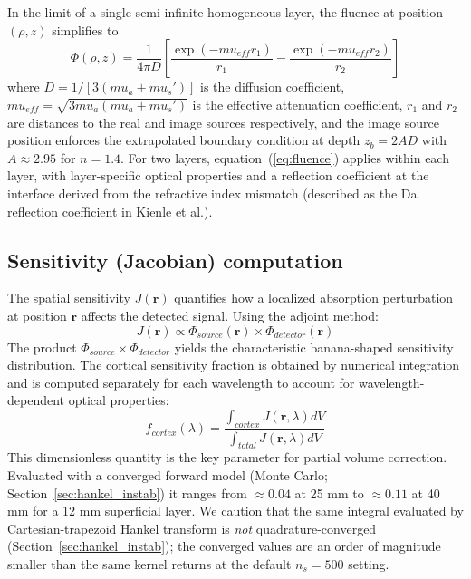\documentclass[11pt]{article}
\def\mu{mu}%
\def\mathrm#1{#1}%
\def\,{ }%
\begin{document}
In the limit of a single semi-infinite homogeneous layer, the fluence at position $(\rho, z)$ simplifies to
\begin{equation}
\Phi(\rho, z) = \frac{1}{4\pi D}\left[\frac{\exp(-\mu_{\mathrm{eff}}\,r_1)}{r_1} - \frac{\exp(-\mu_{\mathrm{eff}}\,r_2)}{r_2}\right]
\label{eq:fluence}
\end{equation}
where $D = 1/[3(\mu_a + \mu_s')]$ is the diffusion coefficient, $\mu_{\mathrm{eff}} = \sqrt{3\mu_a(\mu_a + \mu_s')}$ is the effective attenuation coefficient, $r_1$ and $r_2$ are distances to the real and image sources respectively, and the image source position enforces the extrapolated boundary condition at depth $z_b = 2AD$ with $A \approx 2.95$ for $n = 1.4$\cite{r27}. For two layers, equation~(\ref{eq:fluence}) applies within each layer, with layer-specific optical properties and a reflection coefficient at the interface derived from the refractive index mismatch (described as the Da reflection coefficient in Kienle et al.\cite{r40}).

\subsection{Sensitivity (Jacobian) computation}
\label{sec:jacobian}

The spatial sensitivity $J(\mathbf{r})$ quantifies how a localized absorption perturbation at position $\mathbf{r}$ affects the detected signal. Using the adjoint method\cite{r26,r28}:
\begin{equation}
J(\mathbf{r}) \propto \Phi_{\mathrm{source}}(\mathbf{r}) \times \Phi_{\mathrm{detector}}(\mathbf{r})
\label{eq:jacobian}
\end{equation}
The product $\Phi_{\mathrm{source}} \times \Phi_{\mathrm{detector}}$ yields the characteristic banana-shaped sensitivity distribution. The cortical sensitivity fraction is obtained by numerical integration and is computed separately for each wavelength to account for wavelength-dependent optical properties:
\begin{equation}
f_{\mathrm{cortex}}(\lambda) = \frac{\int_{\mathrm{cortex}} J(\mathbf{r}, \lambda)\,dV}{\int_{\mathrm{total}} J(\mathbf{r}, \lambda)\,dV}
\label{eq:fcortex}
\end{equation}
This dimensionless quantity is the key parameter for partial volume correction. Evaluated with a converged forward model (Monte Carlo; Section~\ref{sec:hankel_instab}) it ranges from $\approx 0.04$ at 25\,mm to $\approx 0.11$ at 40\,mm for a 12\,mm superficial layer. We caution that the same integral evaluated by Cartesian-trapezoid Hankel transform is \emph{not} quadrature-converged (Section~\ref{sec:hankel_instab}); the converged values are an order of magnitude smaller than the same kernel returns at the default $n_s = 500$ setting.
\end{document}
